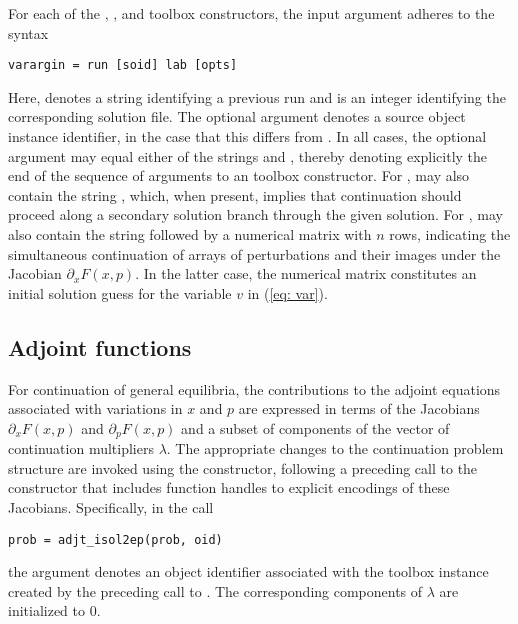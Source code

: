 For each of the , , and  toolbox constructors, the  input argument adheres to the syntax
\begin{lstlisting}[language=coco-highlight]
varargin = run [soid] lab [opts]
\end{lstlisting}
Here,  denotes a string identifying a previous run and  is an integer identifying the corresponding solution file. The optional argument  denotes a source object instance identifier, in the case that this differs from . In all cases, the optional  argument may equal either of the strings  and , thereby denoting explicitly the end of the sequence of arguments to an  toolbox constructor. For ,  may also contain the string , which, when present, implies that continuation should proceed along a secondary solution branch through the given solution. For ,  may also contain the string  followed by a numerical matrix with $n$ rows, indicating the simultaneous continuation of arrays of perturbations and their images under the Jacobian $\partial_x F(x,p)$. In the latter case, the numerical matrix constitutes an initial solution guess for the variable $v$ in (\ref{eq: var}).

\subsection{Adjoint functions}
For continuation of general equilibria, the contributions to the adjoint equations associated with variations in $x$ and $p$ are expressed in terms of the Jacobians $\partial_x F(x,p)$ and $\partial_p F(x,p)$ and a subset of components of the vector of continuation multipliers $\lambda$. The appropriate changes to the continuation problem structure are invoked using the  constructor, following a preceding call to the  constructor that includes function handles to explicit encodings of these Jacobians.  Specifically, in the call
\begin{lstlisting}[language=coco-highlight]
prob = adjt_isol2ep(prob, oid)
\end{lstlisting}
the  argument denotes an object identifier associated with the toolbox instance created by the preceding call to . The corresponding components of $\lambda$ are initialized to $0$.


